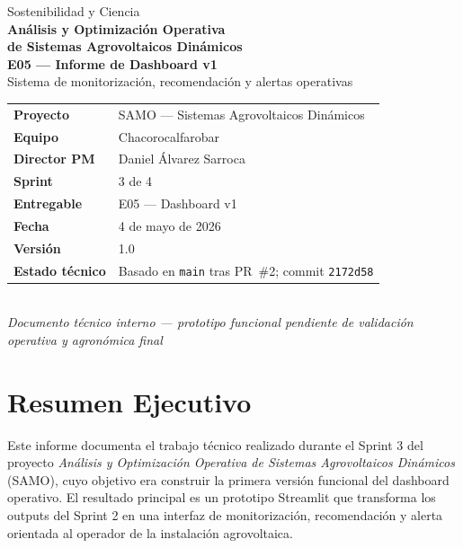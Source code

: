 \documentclass[11pt,a4paper]{article}
\begin{document}
\thispagestyle{empty}

\vspace*{1.2cm}
\begin{center}
  {\large Sostenibilidad y Ciencia}\\[0.6em]
  {\LARGE \textbf{Análisis y Optimización Operativa}}\\
  {\LARGE \textbf{de Sistemas Agrovoltaicos Dinámicos}}\\[2em]
  {\Large \textbf{E05 — Informe de Dashboard v1}}\\[0.5em]
  {\normalsize Sistema de monitorización, recomendación y alertas operativas}\\[2.5em]

  \begin{tabular}{ll}
    \textbf{Proyecto}       & SAMO — Sistemas Agrovoltaicos Dinámicos \\
    \textbf{Equipo}         & Chacorocalfarobar \\
    \textbf{Director PM}    & Daniel Álvarez Sarroca \\
    \textbf{Sprint}         & 3 de 4 \\
    \textbf{Entregable}     & E05 — Dashboard v1 \\
    \textbf{Fecha}          & 4 de mayo de 2026 \\
    \textbf{Versión}        & 1.0 \\
    \textbf{Estado técnico} & Basado en \texttt{main} tras PR~\#2; commit \texttt{2172d58} \\
  \end{tabular}\\[2em]

  \small\textit{Documento técnico interno — prototipo funcional pendiente de validación operativa y agronómica final}
\end{center}

\newpage
\tableofcontents
\newpage

\section{Resumen Ejecutivo}

Este informe documenta el trabajo técnico realizado durante el Sprint 3 del proyecto
\textit{Análisis y Optimización Operativa de Sistemas Agrovoltaicos Dinámicos} (SAMO), cuyo
objetivo era construir la primera versión funcional del dashboard operativo. El resultado
principal es un prototipo Streamlit que transforma los outputs del Sprint 2 en una interfaz
de monitorización, recomendación y alerta orientada al operador de la instalación agrovoltaica.
\end{document}
